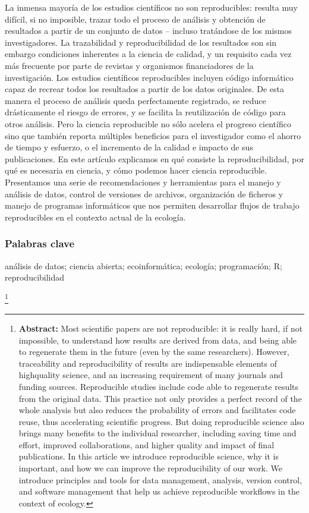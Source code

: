 \documentclass[]{tufte-handout}
\begin{document}
La inmensa mayoría de los estudios científicos no son reproducibles:
resulta muy difícil, si no imposible, trazar todo el proceso de análisis
y obtención de resultados a partir de un conjunto de datos -- incluso
tratándose de los mismos investigadores. La trazabilidad y
reproducibilidad de los resultados son sin embargo condiciones
inherentes a la ciencia de calidad, y un requisito cada vez más
frecuente por parte de revistas y organismos financiadores de la
investigación. Los estudios científicos reproducibles incluyen código
informático capaz de recrear todos los resultados a partir de los datos
originales. De esta manera el proceso de análisis queda perfectamente
registrado, se reduce drásticamente el riesgo de errores, y se facilita
la reutilización de código para otros análisis. Pero la ciencia
reproducible no sólo acelera el progreso científico sino que también
reporta múltiples beneficios para el investigador como el ahorro de
tiempo y esfuerzo, o el incremento de la calidad e impacto de sus
publicaciones. En este artículo explicamos en qué consiste la
reproducibilidad, por qué es necesaria en ciencia, y cómo podemos hacer
ciencia reproducible. Presentamos una serie de recomendaciones y
herramientas para el manejo y análisis de datos, control de versiones de
archivos, organización de ficheros y manejo de programas informáticos
que nos permiten desarrollar flujos de trabajo reproducibles en el
contexto actual de la ecología.

\hypertarget{palabras-clave}{%
\subsubsection{Palabras clave}\label{palabras-clave}}

análisis de datos; ciencia abierta; ecoinformática; ecología;
programación; R; reproducibilidad

\footnote{\textbf{Abstract:} Most scientific papers are not
  reproducible: it is really hard, if not impossible, to understand how
  results are derived from data, and being able to regenerate them in
  the future (even by the same researchers). However, traceability and
  reproducibility of results are indispensable elements of highquality
  science, and an increasing requirement of many journals and funding
  sources. Reproducible studies include code able to regenerate results
  from the original data. This practice not only provides a perfect
  record of the whole analysis but also reduces the probability of
  errors and facilitates code reuse, thus accelerating scientific
  progress. But doing reproducible science also brings many benefits to
  the individual researcher, including saving time and effort, improved
  collaborations, and higher quality and impact of final publications.
  In this article we introduce reproducible science, why it is
  important, and how we can improve the reproducibility of our work. We
  introduce principles and tools for data management, analysis, version
  control, and software management that help us achieve reproducible
  workflows in the context of ecology.}
\end{document}

